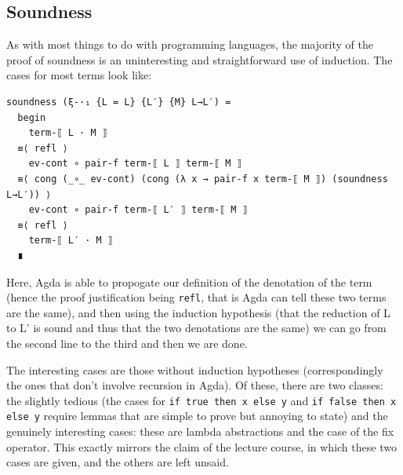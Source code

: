 \documentclass[12pt,a4paper,twoside,openright]{report}
\begin{document}
\subsection{Soundness}
As with most things to do with programming languages, the majority of the proof of soundness is an uninteresting and straightforward use of induction. The cases for most terms look like:
\begin{verbatim}
soundness (ξ-·₁ {L = L} {L′} {M} L→L′) =
  begin
    term-⟦ L · M ⟧
  ≡⟨ refl ⟩
    ev-cont ∘ pair-f term-⟦ L ⟧ term-⟦ M ⟧
  ≡⟨ cong (_∘_ ev-cont) (cong (λ x → pair-f x term-⟦ M ⟧) (soundness L→L′)) ⟩
    ev-cont ∘ pair-f term-⟦ L′ ⟧ term-⟦ M ⟧
  ≡⟨ refl ⟩
    term-⟦ L′ · M ⟧
  ∎
\end{verbatim}
Here, Agda is able to propogate our definition of the denotation of the term (hence the proof justification being \texttt{refl}, that is Agda can tell these two terms are the same), and then using the induction hypothesis (that the reduction of L to L' is sound and thus that the two denotations are the same) we can go from the second line to the third and then we are done. 

The interesting cases are those without induction hypotheses (correspondingly the ones that don't involve recursion in Agda). Of these, there are two classes: the slightly tedious (the cases for \texttt{if true then x else y} and \texttt{if false then x else y} require lemmas that are simple to prove but annoying to state) and the genuinely interesting cases: these are lambda abstractions and the case of the fix operator. This exactly mirrors the claim of the lecture course, in which these two cases are given, and the others are left unsaid. 
\end{document}

